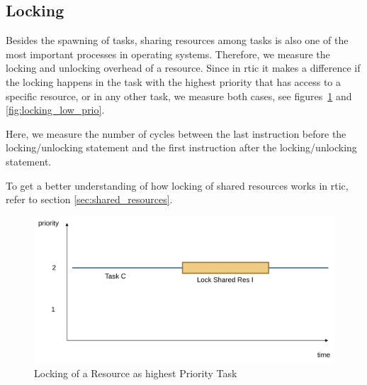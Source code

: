 \subsection{Locking}

Besides the spawning of tasks, sharing resources among tasks is also one of the most important processes in operating systems. Therefore, we measure the locking and unlocking overhead of a resource. Since in \gls{rtic} it makes a difference if the locking happens in the task with the highest priority that has access to a specific resource, or in any other task, we measure both cases, see figures~\ref{fig:locking_high_prio} and \ref{fig:locking_low_prio}.

Here, we measure the number of cycles between the last instruction before the locking/unlocking statement and the first instruction after the locking/unlocking statement.

To get a better understanding of how locking of shared resources works in \gls{rtic}, refer to section \ref{sec:shared_resources}.

\begin{figure}
  \centerfloat
  \includegraphics[width=\textwidth]{fig/locking_high_prio.svg.pdf}
  \caption{Locking of a Resource as highest Priority Task}%
  \label{fig:locking_high_prio}
\end{figure}

